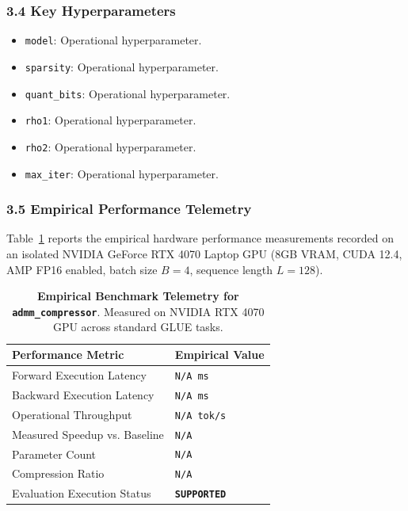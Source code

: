 \subsubsection*{3.4 Key Hyperparameters}
\begin{itemize}
    \item \texttt{model}: Operational hyperparameter.
    \item \texttt{sparsity}: Operational hyperparameter.
    \item \texttt{quant\_bits}: Operational hyperparameter.
    \item \texttt{rho1}: Operational hyperparameter.
    \item \texttt{rho2}: Operational hyperparameter.
    \item \texttt{max\_iter}: Operational hyperparameter.
\end{itemize}

\subsubsection*{3.5 Empirical Performance Telemetry}
Table~\ref{tab:telemetry_admm_compressor} reports the empirical hardware performance measurements recorded on an isolated NVIDIA GeForce RTX 4070 Laptop GPU (8GB VRAM, CUDA 12.4, AMP FP16 enabled, batch size $B=4$, sequence length $L=128$).

\begin{table}[h]
\centering
\small
\caption{\textbf{Empirical Benchmark Telemetry for \texttt{admm\_compressor}}. Measured on NVIDIA RTX 4070 GPU across standard GLUE tasks.}
\label{tab:telemetry_admm_compressor}
\begin{tabularx}{\columnwidth}{lX}
\toprule
\textbf{Performance Metric} & \textbf{Empirical Value} \\
\midrule
Forward Execution Latency & \texttt{N/A ms} \\
Backward Execution Latency & \texttt{N/A ms} \\
Operational Throughput & \texttt{N/A tok/s} \\
Measured Speedup vs. Baseline & \texttt{N/A} \\
Parameter Count & \texttt{N/A} \\
Compression Ratio & \texttt{N/A} \\
Evaluation Execution Status & \textbf{\texttt{SUPPORTED}} \\
\bottomrule
\end{tabularx}
\end{table}

